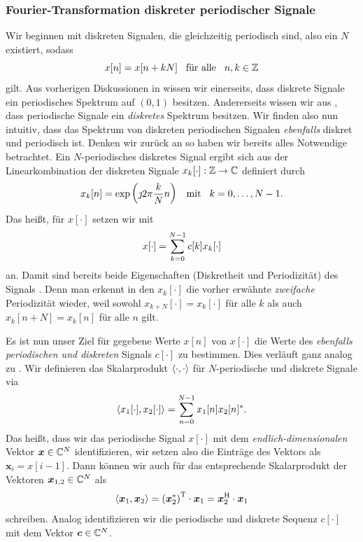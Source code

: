 \subsubsection{Fourier-Transformation diskreter periodischer Signale}\label{sec:fourier:disc_period}
%
Wir beginnen mit diskreten Signalen, die gleichzeitig periodisch sind, also ein $N$ existiert, sodass
\[
x[n] = x[n+kN] {\hspace{3mm} \text{für alle} \hspace{3mm}} n,k \in \mathbb{Z} 
\]
gilt.
Aus vorherigen Diskussionen in  wissen wir einerseits, dass diskrete Signale ein periodisches Spektrum auf $(0,1)$ besitzen.
Andererseits wissen wir aus , dass periodische Signale ein \emph{diskretes} Spektrum besitzen.
Wir finden also nun intuitiv, dass das Spektrum von diskreten periodischen Signalen \emph{ebenfalls} diskret und periodisch ist.
Denken wir zurück an  so haben wir bereits alles Notwendige betrachtet.
Ein $N$-periodisches diskretes Signal ergibt sich aus der Linearkombination der diskreten Signale $x_k[\cdot] : \mathbb{Z} \rightarrow \mathbb{C}$ definiert durch
\[
x_k[n] = \exp\left(\jmath 2 \pi \frac k N n \right) {\hspace{3mm} \text{mit} \hspace{3mm}} k = 0, \ldots, N-1.
\]
Das heißt, für $x[\cdot]$ setzen wir mit
\[
x[\cdot] = {\sum\limits_{k = 0}^{N-1}{c[k] x_k[\cdot]}}
\]
an.
Damit sind bereits beide Eigenschaften (Diskretheit und Periodizität) des Signals .
Denn man erkennt in den $x_{k}[\cdot]$ die vorher erwähnte \emph{zweifache} Periodizität wieder, weil sowohl $x_{k+N}[\cdot] = x_{k}[\cdot]$ für alle $k$ als auch $x_k[n+N] = x_k[n]$ für alle $n$ gilt.

Es ist nun unser Ziel für gegebene Werte $x[n]$ von $x[\cdot]$ die Werte des \emph{ebenfalls periodischen und diskreten} Signals $c[\cdot]$ zu bestimmen.
Dies verläuft ganz analog zu .
Wir definieren das Skalarprodukt ${\left\langle \cdot,\cdot \right\rangle}$ für $N$-periodische und diskrete Signale via
\[
{\left\langle x_1[\cdot],x_2[\cdot] \right\rangle} 
    = {\sum\limits_{n = 0}^{N-1}{x_1[n] x_2[n]^\ast}}.
\]
Das heißt, dass wir das periodische Signal $x[\cdot]$ mit dem \emph{endlich-dimensionalen} Vektor $\bm x \in \mathbb{C}^{N}$ identifizieren, wir setzen also die Einträge des Vektors als $\bm x_i = x[i-1]$.
Dann können wir auch für das entsprechende Skalarprodukt der Vektoren $\bm x_{1,2} \in \mathbb{C}^N$ als
\[
{\left\langle \bm x_1,\bm x_2 \right\rangle} 
    = \left(\bm x_2^\ast\right)^{\mathrm{T}} \cdot \bm x_1 
    = \bm x_2^{\mathrm{H}} \cdot \bm x_1
\]
schreiben.
Analog identifizieren wir die periodische und diskrete Sequenz $c[\cdot]$ mit dem Vektor $\bm c \in \mathbb{C}^N$.

